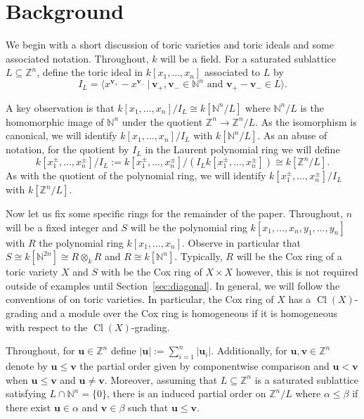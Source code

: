 \documentclass{amsart}
\newcommand{\NN}{\mathbb{N}}
\newcommand{\ZZ}{\mathbb{Z}}
\newcommand{\field}{k}
\DeclareMathOperator{\Cl}{Cl}
\theoremstyle{remark}
\begin{document}
\section{Background}
\label{sec:background}

We begin with a short discussion of toric varieties and toric ideals and some associated notation. Throughout, $\field$ will be a field.
For a saturated sublattice $L\subseteq \ZZ^n$, define the toric ideal in $\field[x_1,\ldots,x_n]$ associated to $L$ by
\[I_L = \langle x^{\bm{v}_+}-x^{\bm{v}_{-}}\,|\, \bm{v}_{+},\bm{v}_{-}\in \NN^n\text{ and } \bm{v}_{+}-\bm{v}_{-}\in L\rangle.\]

A key observation is that $\field[x_1,\ldots,x_n]/I_L\cong \field [\NN^{n}/L]$ where $\NN^{n}/L$ is
the homomorphic image of $\NN^{n}$ under the quotient $\ZZ^n\rightarrow \ZZ^n/L$.
As the isomorphism is canonical, we will identify $\field[x_1,\ldots,x_n]/I_L$ with $\field [\NN^{n}/L]$.
As an abuse of notation, for the quotient by $I_L$ in the Laurent polynomial ring we will define
\[\field[x_1^{\pm},\ldots,x_n^{\pm}]/I_L:=\field[x_1^{\pm},\ldots,x_n^{\pm}]/(I_L\field[x_1^{\pm},\ldots,x_n^{\pm}]) \cong \field[\ZZ^n/L].\]
As with the quotient of the polynomial ring, we will identify $\field[x_1^{\pm},\ldots,x_n^{\pm}]/I_L$ with $\field[\ZZ^n/L]$.


Now let us fix some specific rings for the remainder of the paper. Throughout, $n$ will be a fixed integer and $S$ will be the polynomial ring $\field[x_1,\ldots,x_n,y_1,\ldots,y_n]$ with $R$ the polynomial ring $\field[x_1,\ldots,x_n]$. Observe in particular that $S\cong \field[\NN^{2n}]\cong R\otimes_{\field} R$ and $R\cong \field[\NN^{n}]$. Typically, $R$ will be the Cox ring of a toric variety $X$ and $S$ with be the Cox ring of $X\times X$ however, this is not required outside of examples until Section~\ref{sec:diagonal}.
In general, we will follow the conventions of \cite{CLS11} on toric varieties. In particular, the Cox ring of $X$ has a $\Cl(X)$-grading and a module over the Cox ring is homogeneous if it is homogeneous with respect to the $\Cl(X)$-grading.

Throughout, for $\bm{u}\in \ZZ^n$ define $\left|\bm{u}\right|:=\sum_{i=1}^{n} \left|\bm{u}_i\right|$. Additionally, for $\bm{u},\bm{v}\in \ZZ^n$ denote by $\bm{u}\leq \bm{v}$ the partial order given by componentwise comparison and $\bm{u}<\bm{v}$ when $\bm{u}\leq \bm{v}$ and $\bm{u}\neq \bm{v}$. Moreover, assuming that $L\subseteq \ZZ^n$ is a saturated sublattice satisfying $L\cap \NN^n = \{0\}$, there is an induced partial order on $\ZZ^n/L$ where $\alpha\leq \beta$ if there exist $\bm{u}\in \alpha$ and $\bm{v}\in \beta$ such that $\bm{u}\leq \bm{v}$.
\end{document}
